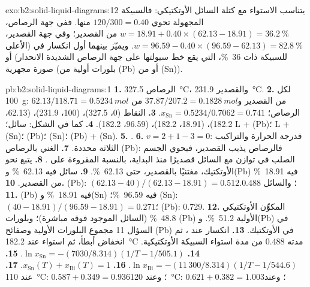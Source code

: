 \begin{solution}{exo:b2:solid-liquid-diagrams:12}
يتناسب الاستواء مع كتلة السائل الأوتكتيكي: فالسبيكة المجهولة تحوي
$120/300 = 0.40$ منها. ففي جهة الرصاص، $w = 18.91 + 0.40 \times (62.13 -
18.91) = 36.2~\%$ من القصدير؛ وفي جهة القصدير، $w = 96.59 - 0.40 \times (96.59 - 62.13) =
82.8~\%$. ويميّز بينهما أول انكسار في  (الأعلى للسبيكة ذات 36~\%،
التي يقع خط سيولتها على جهة الرصاص الشديدة الانحدار) أو صورة مجهرية (بلورات
أولية من (Pb) أو من (Sn)).
\end{solution}

\begin{solution}{pb:b2:solid-liquid-diagrams:1}
\textbf{1.} الرصاص \qty{327.5}{\degreeCelsius}، والقصدير \qty{231.9}{\degreeCelsius}.
\textbf{2.} لكل \qty{100}{g}: $62.13/118.71 = \qty{0.5234}{mol}$ من القصدير 
و$37.87/207.2 = \qty{0.1828}{mol}$ من الرصاص؛ $x_{\mathrm{Sn}} = 0.5234/0.7062 =
0.741$.
\textbf{3.} النقاط (0، 327.5)، (100، 231.9)، (62.13، 182.2)، (18.91، 182.2)،
(96.59، 182.2).
\textbf{4.} كما في الشكل: سائل؛ L + (Pb)؛ L + (Sn)؛ (Pb)؛ (Sn)؛ (Pb) + (Sn).
\textbf{5.} .
\textbf{6.} $v = 2 + 1 - 3 = 0$: فدرجة الحرارة والتراكيب الثلاثة
محددة.
\textbf{7.}  الغني بالرصاص (Pb): فالرصاص يذيب القصدير، فيحوي الجسم الصلب في
توازن مع السائل قصديرًا منذ البداية، بالنسبة المقروءة على
.
\textbf{8.} يتبع  نحو الأوتكتيك، مغتنيًا بالقصدير،
حتى 62.13~\%.
\textbf{9.} سائل فيه 62.13~\% و(Pb) فيه 18.91~\% من القصدير.
\textbf{10.} (Pb): $(62.13 - 40)/(62.13 - 18.91) = 0.512$؛ والسائل 0.488.
\textbf{11.} (Pb) فيه 18.91~\% و(Sn) فيه 96.59~\%؛ (Sn): $(40 - 18.91)/(96.59 -
18.91) = 0.271$؛ (Pb): 0.729.
\textbf{12.} المكوِّن الأوتكتيكي 48.8~\% (السائل الموجود فوقه مباشرة)؛
وبلورات (Pb) الأولية 51.2~\%. و(Pb) في السؤال 11 مجموع البلورات
الأولية وصفائح (Pb) في الأوتكتيك.
\textbf{13.} انكسار عند ، ثم انخفاض أبطأ، ثم استواء عند
\qty{182.2}{\degreeCelsius} مدته 0.488 من مدة استواء السبيكة الأوتكتيكية.
\textbf{14.} $\ln x_{\mathrm{Sn}} = -(7030/8.314)(1/T - 1/505.1)$.
\textbf{15.} $\ln x_{\mathrm{Bi}} = -(11\,300/8.314)(1/T - 1/544.6)$.
\textbf{16.} $x_{\mathrm{Sn}}(T) + x_{\mathrm{Bi}}(T) = 1$.
\textbf{17.} عند \qty{110}{\degreeCelsius}: $0.587 + 0.349 = 0.936$؛ وعند
\qty{120}{\degreeCelsius}: $0.621 + 0.382 = 1.003$؛ وعند

\end{solution}
